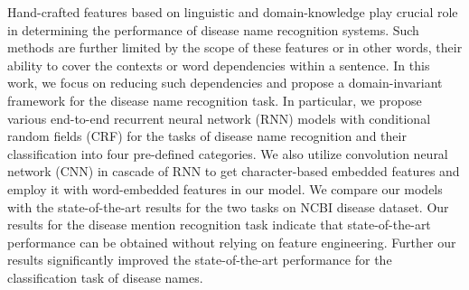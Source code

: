 Hand-crafted features based on linguistic and domain-knowledge play crucial role in determining the performance of disease name recognition systems. Such methods are further limited by the scope of these features or in other words, their ability to cover the contexts or word dependencies within a sentence. In this work, we focus on reducing such dependencies and propose a domain-invariant framework for the disease name recognition task. In particular, we propose various end-to-end recurrent neural network (RNN) models with conditional random fields (CRF) for the tasks of disease name recognition and their classification into four pre-defined categories. We also utilize convolution neural network (CNN) in cascade of RNN to get character-based embedded features and employ it with word-embedded features in our model. We compare our models with the state-of-the-art results for the two tasks on NCBI disease dataset. Our results for the disease mention recognition task indicate that state-of-the-art performance can be obtained without relying on feature engineering. Further our results significantly improved the state-of-the-art performance for the classification task of disease names.
